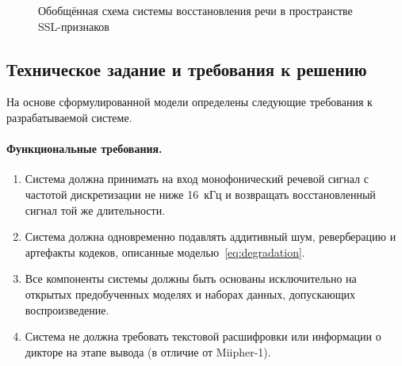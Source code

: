 \begin{figure}[H]
    \centering
    \caption{Обобщённая схема системы восстановления речи в пространстве
        SSL-признаков}
    \label{fig:pipeline}
\end{figure}

\subsection{Техническое задание и требования к решению}

На основе сформулированной модели определены следующие требования к
разрабатываемой системе.

\paragraph{Функциональные требования.}
\begin{enumerate}
    \item Система должна принимать на вход монофонический речевой сигнал с
        частотой дискретизации не ниже 16~кГц и возвращать восстановленный
        сигнал той же длительности.
    \item Система должна одновременно подавлять аддитивный шум, реверберацию и
        артефакты кодеков, описанные моделью~\eqref{eq:degradation}.
    \item Все компоненты системы должны быть основаны исключительно на открытых
        предобученных моделях и наборах данных, допускающих воспроизведение.
    \item Система не должна требовать текстовой расшифровки или информации о
        дикторе на этапе вывода (в отличие от Miipher-1).
\end{enumerate}

